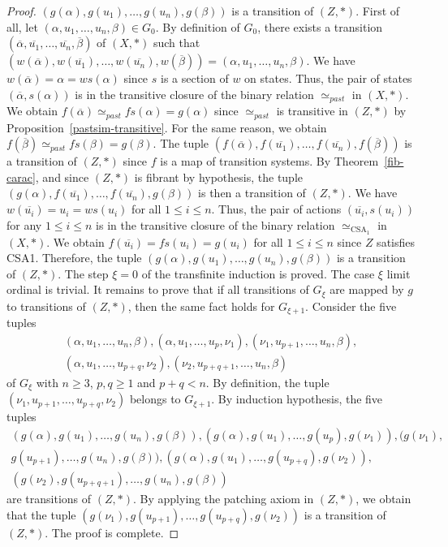 \documentclass[a4paper,12pt]{amsart}
\begin{document}
\begin{proof}
$(g(\alpha),g(u_1),\dots,g(u_n),g(\beta))$ is a transition of
$(Z,*)$. First of all, let $(\alpha,u_1,\dots,u_n,\beta) \in G_0$. By
definition of $G_0$, there exists a transition
$(\overline{\alpha},\overline{u_1},\dots,\overline{u_n},\overline{\beta})$
of $(X,*)$ such that
$(w(\overline{\alpha}),w(\overline{u_1}),\dots,w(\overline{u_n}),w(\overline{\beta}))
= (\alpha,u_1,\dots,u_n,\beta)$.  We have $w(\overline{\alpha}) =
\alpha = ws(\alpha)$ since $s$ is a section of $w$ on states. Thus,
the pair of states $(\overline{\alpha},s(\alpha))$ is in the
transitive closure of the binary relation $\simeq_{past}$ in
$(X,*)$. We obtain $f(\overline{\alpha}) \simeq_{past}
fs(\alpha)=g(\alpha)$ since $\simeq_{past}$ is transitive in $(Z,*)$
by Proposition~\ref{pastsim-transitive}. For the same reason, we
obtain $f(\overline{\beta}) \simeq_{past} fs(\beta) =g(\beta)$. The
tuple
$(f(\overline{\alpha}),f(\overline{u_1}),\dots,f(\overline{u_n}),f(\overline{\beta}))$
is a transition of $(Z,*)$ since $f$ is a map of transition
systems. By Theorem~\ref{fib-carac}, and since $(Z,*)$ is fibrant by
hypothesis, the tuple
$(g(\alpha),f(\overline{u_1}),\dots,f(\overline{u_n}),g(\beta))$ is
then a transition of $(Z,*)$. We have $w(\overline{u_i})=u_i=ws(u_i)$
for all $1{\leqslant} i {\leqslant} n$. Thus, the pair of actions
$(\overline{u_i},s(u_i))$ for any $1{\leqslant} i {\leqslant} n$ is in the
transitive closure of the binary relation $\simeq_{\operatorname{CSA}_1}$ in
$(X,*)$. We obtain $f(\overline{u_i}) = fs(u_i)=g(u_i)$ for all $1{\leqslant}
i {\leqslant} n$ since $Z$ satisfies CSA1. Therefore, the tuple
$(g(\alpha),g(u_1),\dots,g(u_n),g(\beta))$ is a transition of $(Z,*)$.
The step $\xi=0$ of the transfinite induction is proved. The case
$\xi$ limit ordinal is trivial. It remains to prove that if all
transitions of $G_\xi$ are mapped by $g$ to transitions of $(Z,*)$,
then the same fact holds for $G_{\xi +1}$. Consider the five tuples
\begin{multline*}
(\alpha,u_1, \dots, u_n, \beta), (\alpha,u_1, \dots, u_p, \nu_1),
(\nu_1, u_{p+1}, \dots, u_n, \beta),\\ (\alpha, u_1, \dots, u_{p+q},
\nu_2), (\nu_2, u_{p+q+1}, \dots, u_n, \beta) 
\end{multline*}
of $G_\xi$ with
$n{\geqslant} 3$, $p,q{\geqslant} 1$ and $p+q<n$. By definition, the tuple $(\nu_1,
u_{p+1}, \dots, u_{p+q}, \nu_2)$ belongs to $G_{\xi+1}$. By induction
hypothesis, the five tuples \begin{multline*}(g(\alpha),g(u_1), \dots, g(u_n),
g(\beta)), (g(\alpha),g(u_1), \dots, g(u_p), g(\nu_1)), (g(\nu_1), \\
g(u_{p+1}), \dots, g(u_n), g(\beta)), (g(\alpha), g(u_1), \dots,
g(u_{p+q}), g(\nu_2)),\\ (g(\nu_2), g(u_{p+q+1}), \dots, g(u_n),
g(\beta))\end{multline*} 
are transitions of $(Z,*)$.  By applying the patching axiom
in $(Z,*)$, we obtain that the tuple $(g(\nu_1), g(u_{p+1}), \dots,
g(u_{p+q}), g(\nu_2))$ is a transition of $(Z,*)$.  The proof is
complete.
\end{proof}
\end{document}
